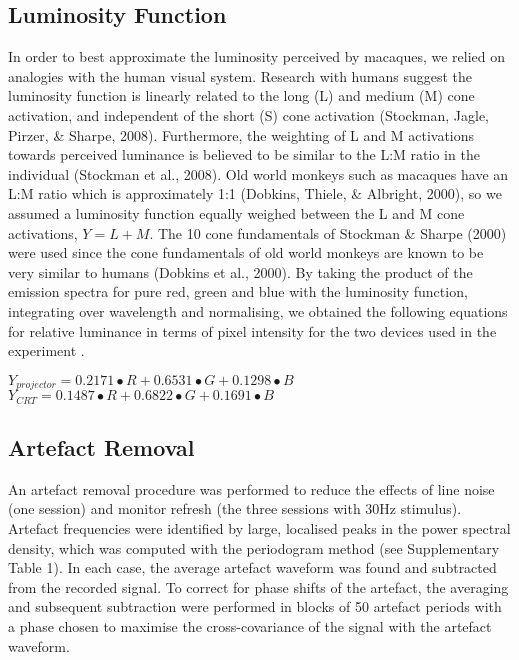 \documentclass{article}
\begin{document}
\subsection{Luminosity Function}
In order to best approximate the luminosity perceived by macaques, we relied on analogies with the human visual system. Research with humans suggest the luminosity function is linearly related to the long (L) and medium (M) cone activation, and independent of the short (S) cone activation (Stockman, Jagle, Pirzer, \& Sharpe, 2008). Furthermore, the weighting of L and M activations towards perceived luminance is believed to be similar to the L:M ratio in the individual (Stockman et al., 2008). Old world monkeys such as macaques have an L:M ratio which is approximately 1:1 (Dobkins, Thiele, \& Albright, 2000), so we assumed a luminosity function equally weighed between the L and M cone activations,  $Y=L+M$. The 10{\textdegree} cone fundamentals of Stockman \& Sharpe (2000) were used since the cone fundamentals of old world monkeys are known to be very similar to humans (Dobkins et al., 2000). By taking the product of the emission spectra for pure red, green and blue with the luminosity function, integrating over wavelength and normalising, we obtained the following equations for relative luminance in terms of pixel intensity for the two devices used in the experiment .

 $Y_{\mathit{projector}}=0.2171{\bullet}R+0.6531{\bullet}G+0.1298{\bullet}B$ $Y_{\mathit{CRT}}=0.1487{\bullet}R+0.6822{\bullet}G+0.1691{\bullet}B$

\subsection{Artefact Removal}
An artefact removal procedure was performed to reduce the effects of line noise (one session) and monitor refresh (the three sessions with 30Hz stimulus). Artefact frequencies were identified by large, localised peaks in the power spectral density, which was computed with the periodogram method (see Supplementary Table 1). In each case, the average artefact waveform was found and subtracted from the recorded signal. To correct for phase shifts of the artefact, the averaging and subsequent subtraction were performed in blocks of 50 artefact periods with a phase chosen to maximise the cross-covariance of the signal with the artefact waveform.
\end{document}
